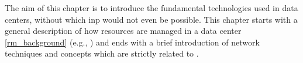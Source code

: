 The aim of this chapter is to introduce the fundamental technologies used in data centers, without which \gls{inp} would not even be possible.
This chapter starts with a general description of how resources are managed in a data center \autoref{rm_background} (e.g., ) and ends with a brief introduction of network techniques and concepts which are strictly related to .